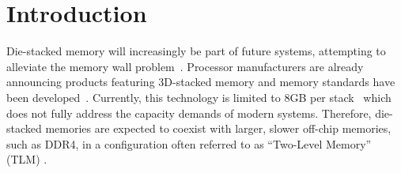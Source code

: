 \section{Introduction}
\label{sec:Introduction}
  


Die-stacked memory will increasingly be part of future systems, 
attempting to alleviate 
the memory wall problem~\cite{wulf-can95}. Processor manufacturers are 
already announcing products featuring 3D-stacked memory \cite{KnightsLanding,NVIDIA,black-micro2013}  and memory standards have been developed~\cite{jedec-wideio,JEDEC-HBM,pawlowski-hotchips2011}. 
Currently, this technology is limited to 8GB per stack~\cite{JEDEC-HBM-REVISED}
which does not fully address the capacity demands of modern systems. 
Therefore, die-stacked memories are expected to coexist with larger, 
slower off-chip memories, such as DDR4, in a configuration often
referred to as ``Two-Level Memory'' (TLM) \cite{cameo,meswani-HPCA21}.  

